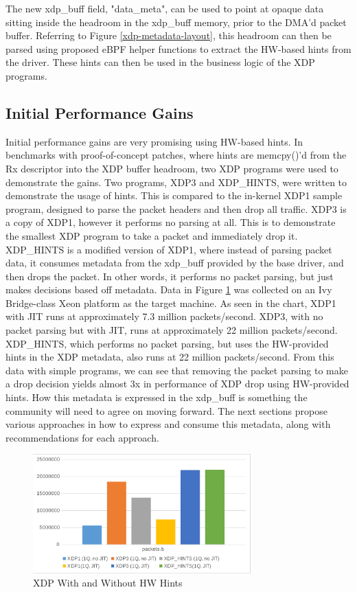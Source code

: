 \documentclass[letterpaper]{article}
\begin{document}
The new xdp\_buff field, "data\_meta", can be used to point at opaque data sitting inside the headroom in the xdp\_buff memory, prior to the DMA'd packet buffer. Referring to Figure \ref{xdp-metadata-layout}, this headroom can then be parsed using proposed eBPF helper functions to extract the HW-based hints from the driver. These hints can then be used in the business logic of the XDP programs.

\subsection{Initial Performance Gains}

Initial performance gains are very promising using HW-based hints. In benchmarks with proof-of-concept patches, where hints are memcpy()'d from the Rx descriptor into the XDP buffer headroom, two XDP programs were used to demonstrate the gains.
\newline
\indent Two programs, XDP3 and XDP\_HINTS, were written to demonstrate the usage of hints. This is compared to the in-kernel XDP1 sample program, designed to parse the packet headers and then drop all traffic.  XDP3 is a copy of XDP1, however it performs no parsing at all. This is to demonstrate the smallest XDP program to take a packet and immediately drop it.  XDP\_HINTS is a modified version of XDP1, where instead of parsing packet data, it consumes metadata from the xdp\_buff provided by the base driver, and then drops the packet. In other words, it performs no packet parsing, but just makes decisions based off metadata.
\newline
\indent Data in Figure \ref {xdp-performance} was collected on an Ivy Bridge-class Xeon platform as the target machine. As seen in the chart, XDP1 with JIT runs at approximately 7.3 million packets/second. XDP3, with no packet parsing but with JIT, runs at approximately 22 million packets/second. XDP\_HINTS, which performs no packet parsing, but uses the HW-provided hints in the XDP metadata, also runs at 22 million packets/second. From this data with simple programs, we can see that removing the packet parsing to make a drop decision yields almost 3x in performance of XDP drop using HW-provided hints.
\newline
\indent How this metadata is expressed in the xdp\_buff is something the community will need to agree on moving forward. The next sections propose various approaches in how to express and consume this metadata, along with recommendations for each approach.
\begin{figure}[h]
\includegraphics[width=3.31in]{xdp-programs-performance.png}
\caption{XDP With and Without HW Hints}
\label{xdp-performance}
\end{figure}
\end{document}
